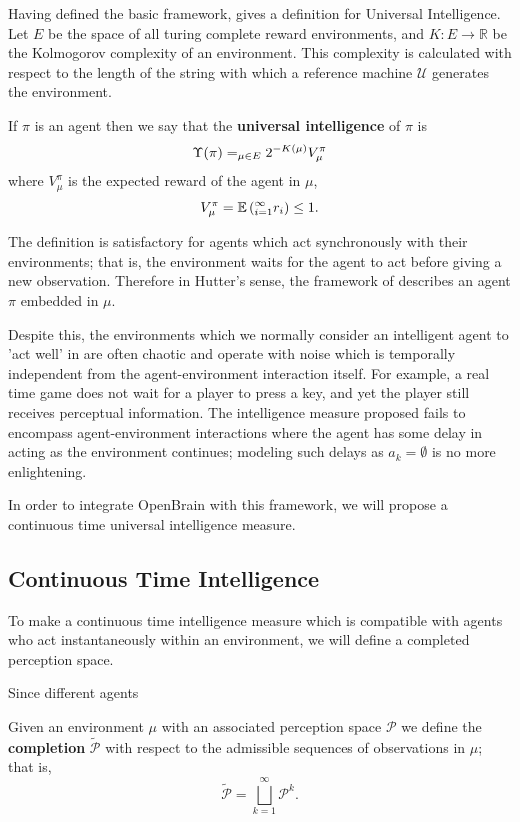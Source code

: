 Having defined the basic framework, \cite{legg2007universal} gives a definition for Universal Intelligence. Let $E$ be the space of all turing complete reward environments, and $K: E \to  \mathbb{R}$ be the Kolmogorov complexity of an environment. This complexity is calculated with respect to the length of the string with which a reference machine $\mathcal{U}$ generates the environment.
\begin{definition} \label{uim}
	If $\pi$ is an agent then we say that the \textbf{universal intelligence} of $\pi$ is
	\begin{equation} \label{eq:uim}
		\Upsilon(\pi) = \relax_{\mu \in E}2^{-K(\mu)}V_\mu^\pi
	\end{equation}
	where $V_\mu^\pi$ is the expected reward of the agent in $\mu$,
	\begin{equation} \label{eq:exprewarduim}
		V_\mu^\pi = \mathbb{E}\left(\relax_{i=1}^\infty r_i\right) \leq 1.
	\end{equation}
\end{definition}

The definition is satisfactory for agents which act synchronously with their environments; that is, the environment waits for the agent to act before giving a new observation. Therefore in Hutter's sense, the framework of \cite{legg2007universal} describes an agent $\pi$ embedded in $\mu$.

Despite this, the environments which we normally consider an intelligent agent to 'act well' in are often chaotic and operate with noise which is temporally independent from the agent-environment interaction itself.  For example, a real time game does not wait for a player to press a key, and yet the player still receives perceptual information. The intelligence measure proposed fails to encompass agent-environment interactions where the agent has some delay in acting as the environment continues; modeling such delays as $a_k = \emptyset$ is no more enlightening.

In order to integrate OpenBrain with this framework, we will propose a continuous time universal intelligence measure.

\subsection{Continuous Time Intelligence}

To make a continuous time intelligence measure which is compatible with agents who act instantaneously within an environment, we will define a completed perception space.

Since different agents 

\begin{definition}
	Given an environment $\mu$ with an associated 
	perception space $\mathcal{P}$ we define the
	\textbf{completion} $\tilde{\mathcal{P}}$ with respect to the admissible sequences of observations in $\mu$; that is,
	\begin{equation}
		\tilde{\mathcal{P}} = \bigsqcup_{k=1}^\infty \mathcal{P}^k.
	\end{equation}
\end{definition}


